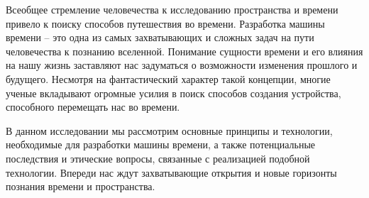 

Всеобщее стремление человечества к исследованию пространства и времени привело к поиску
способов путешествия во времени. Разработка машины времени – это
одна из самых захватывающих и сложных задач на пути человечества
к познанию вселенной. Понимание сущности времени и его влияния
на нашу жизнь заставляют нас задуматься о возможности изменения прошлого
и будущего. Несмотря на фантастический характер такой концепции,
многие ученые вкладывают огромные усилия в поиск способов создания устройства,
способного перемещать нас во времени.

В данном исследовании мы рассмотрим основные
принципы и технологии, необходимые для разработки машины времени, а также потенциальные последствия и этические вопросы, связанные с реализацией подобной технологии. Впереди нас ждут захватывающие открытия и новые горизонты познания времени и пространства.

\pagebreak
